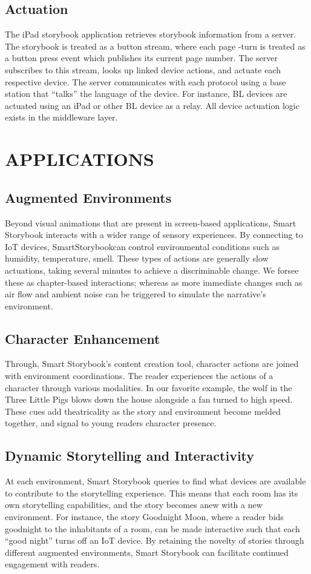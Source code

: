 \documentclass{sigchi}
\newcommand\name{SmartStorybook}
\begin{document}
\subsection{Actuation}
The iPad storybook application retrieves storybook information from a server. The storybook is treated as a button stream, where each page -turn is treated as a button press event which publishes its current page number. The server subscribes to this stream, looks up linked device actions, and actuate each respective device. 
The server communicates with each protocol using a base station that ``talks'' the language of the device. For instance, BL devices are actuated using an iPad or other BL device as a relay. All device actuation logic exists in the middleware layer. 



\section{APPLICATIONS}
\subsection{Augmented Environments}
Beyond visual animations that are present in screen-based applications, Smart Storybook interacts with a wider range of sensory experiences. By connecting to IoT devices, \name can control environmental conditions such as humidity, temperature, smell. These types of actions are generally slow actuations, taking several minutes to achieve a discriminable change. We forsee these as chapter-based interactions; whereas as more immediate changes such as air flow and ambient noise can be triggered to simulate the narrative's environment.


\subsection{Character Enhancement}
Through, Smart Storybook's content creation tool, character actions are joined with environment coordinations. The reader experiences the actions of a character through various modalities. In our favorite example, the wolf in the Three Little Pigs blows down the house alongside a fan turned to high speed. These cues add theatricality as the story and environment become melded together, and signal to young readers character presence. 
\subsection{Dynamic Storytelling and Interactivity}
At each environment, Smart Storybook queries to find what devices are available to contribute to the storytelling experience. This means that each room has its own storytelling capabilities, and the story becomes anew with a new environment. For instance, the story Goodnight Moon, where a reader bids goodnight to the inhabitants of a room, can be made interactive such that each “good night” turns off an IoT device. By retaining the novelty of stories through different augmented environments, Smart Storybook can facilitate continued engagement with readers. 
\end{document}
